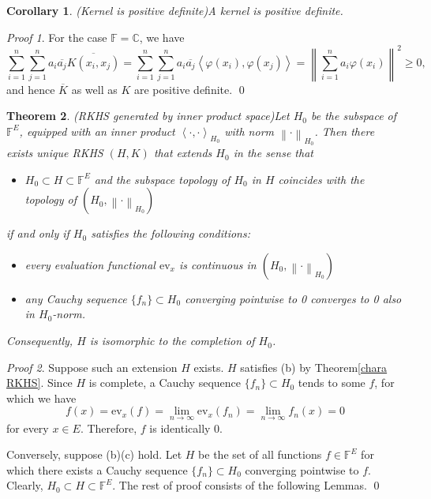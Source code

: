 \documentclass[a4paper,12pt]{article}
\newtheorem{thm}{Theorem}[section]
\newtheorem{cor}[thm]{Corollary}
\theoremstyle{remark}
\newtheorem*{prf}{Proof}
\theoremstyle{definition}
\theoremstyle{definition}
\theoremstyle{definition}
\newcommand{\ip}[2]{\left<#1, #2 \right>}
\newcommand{\norm}[1]{\left\| #1 \right\|}
\newcommand{\ev}[1]{\mathrm{ev}_{#1}}
\begin{document}
\begin{cor} (Kernel is positive definite)\label{kernel is pd}
	A kernel is positive definite.
\end{cor}
\begin{prf}
	For the case \( \mathbb{F}=\mathbb{C} \), we have
	\begin{equation*}
		\sum_{i=1}^{n} \sum_{j=1}^{n} a_i \overline{a_j} \overline{K(x_i,x_j)}
		= \sum_{i=1}^{n} \sum_{j=1}^{n} a_i \overline{a_j} \ip{\varphi(x_i)}{\varphi(x_j)}
		= \norm{\sum_{i=1}^{n} a_i \varphi(x_i) }^2 \ge 0,
	\end{equation*}
	and hence \( \overline{K} \) as well as \( K \) are positive definite.
	\qed\end{prf}

\begin{thm} (RKHS generated by inner product space)\label{RKHS generated by ip sp}
	Let \( H_0 \) be the subspace of \( \mathbb{F}^E \), equipped with an inner product \( \ip{\cdot }{\cdot }_{H_0} \) with norm \( \norm{\cdot }_{H_0} \).
	Then there exists unique RKHS \( (H,K) \) that extends \( H_0 \) in the sense that
	\begin{itemize}
		\item[(a)] \( H_0 \subset H \subset \mathbb{F}^E\) and the subspace topology of \( H_0 \) in \( H \) coincides with the topology of \( (H_0, \norm{\cdot }_{H_0}) \)
	\end{itemize}
	if and only if \( H_0 \) satisfies the following conditions:
	\begin{itemize}
		\item[(b)] every evaluation functional \( \ev{x} \) is continuous in \( (H_0, \norm{\cdot }_{H_0})\)
		\item[(c)] any Cauchy sequence \( \{f_n\} \subset H_0 \) converging pointwise to 0 converges to 0 also in \( H_0 \)-norm.
	\end{itemize}
	Consequently, \( H \) is isomorphic to the completion of \( H_0 \).
\end{thm}
\begin{prf}
	Suppose such an extension \( H \) exists. \( H \) satisfies (b) by Theorem\ref{chara RKHS}.
	Since \( H \) is complete, a Cauchy sequence \( \{f_n\} \subset H_0\) tends to some \( f \), for which we have
	\begin{equation*}
		f(x) = \ev{x}(f) = \lim_{n \to \infty} \ev{x}(f_n) = \lim_{n \to \infty} f_n(x) = 0
	\end{equation*}
	for every \( x \in E \). Therefore, \( f \) is identically 0.

	Conversely, suppose (b)(c) hold. Let \( H \) be the set of all functions \( f \in \mathbb{F}^E \) for which there exists a Cauchy sequence \( \{f_n\} \subset H_0 \) converging pointwise to \( f \). Clearly, \( H_0 \subset H \subset \mathbb{F}^E \). The rest of proof consists of the following Lemmas.
	\qed\end{prf}
\end{document}
